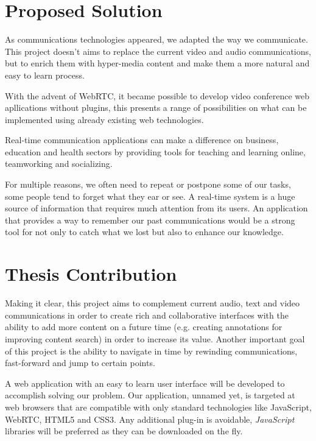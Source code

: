 \section{Proposed Solution}
\label{section:proposed}


	As communications technologies appeared, we adapted the way we communicate. This project doesn't aims to replace the current video and audio communications, but to enrich them with hyper-media content and make them a more natural and easy to learn process. 

	{\color{blue}With the advent of WebRTC, it became possible to develop video conference web apllications without plugins, this presents a range of possibilities on what can be implemented using already existing web technologies.}
		
    Real-time communication applications can make a difference on business, education and health sectors by providing tools for teaching and learning online, teamworking and socializing.

	For multiple reasons, we often need to repeat or postpone some of our tasks, some people tend to forget what they ear or see.
	A real-time system is a huge source of information that requires much attention from its users. An application that provides a way to remember our past communications would be a strong tool for not only to catch what we lost but also to enhance our knowledge.





\section{Thesis Contribution}
\label{section:contribution}

	Making it clear, this project aims to complement current audio, text and video communications in order to create rich and collaborative interfaces with the ability to add more content on a future time (e.g. creating annotations for improving content search) in order to increase its value. Another important goal of this project is the ability to navigate in time by rewinding communications, fast-forward and jump to certain points.

	A web application with an easy to learn user interface will be developed to accomplish solving our problem. Our application, unnamed yet, is targeted at web browsers that are compatible with only standard technologies like JavaScript, \ac{WebRTC}, \ac{HTML}5 and \ac{CSS}3. Any additional plug-in is avoidable, \emph{JavaScript} libraries will be preferred as they can be downloaded on the fly.  

